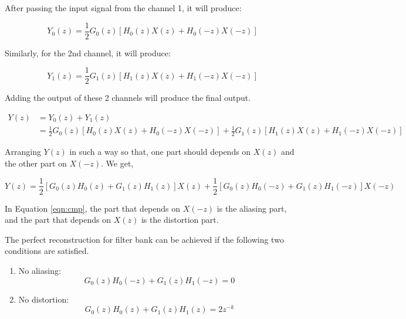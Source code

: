 After passing the input signal from the channel 1, it will produce:

\begin{equation} \label{eqn_wavelet_transform}
{Y_{0}(z) = \frac{1}{2}G_{0}(z)[H_{0}(z)X(z) + H_{0}(-z)X(-z)]}
\end{equation}

Similarly, for the 2nd channel, it will produce:


\begin{equation} \label{eqn_wavelet_transform}
{Y_{1}(z) = \frac{1}{2}G_{1}(z)[H_{1}(z)X(z) + H_{1}(-z)X(-z)]}
\end{equation}

Adding the output of these 2 channels will produce the final output.



\begin{equation} \label{eq1}
\begin{split}
Y(z)  &= Y_{0}(z) + Y_{1}(z) \\
&= \frac{1}{2}G_{0}(z)[H_{0}(z)X(z) + H_{0}(-z)X(-z)] + \frac{1}{2}G_{1}(z)[H_{1}(z)X(z) + H_{1}(-z)X(-z)]
\end{split}
\end{equation}


Arranging $Y(z)$ in such a way so that, one part should depends on $X(z)$ and the other part on $X(-z)$. We get,

\begin{equation} \label{eqn:cmp}
{Y(z) = \frac{1}{2}[G_{0}(z)H_{0}(z) + G_{1}(z)H_{1}(z)]X(z) + \frac{1}{2}[G_{0}(z)H_{0}(-z) + G_{1}(z)H_{1}(-z)]X(-z)}
\end{equation}

In Equation \ref{eqn:cmp}, the part that depends on $X(-z)$ is the aliasing part, and the part that depends on $X(z)$ is the distortion part.



The perfect reconstruction for filter bank can be achieved if the following two conditions are satisfied.

\begin{enumerate}
	\item No aliasing: 
	\begin{equation} \label{eqn:noalias}
	{G_{0}(z)H_{0}(-z) + G_{1}(z)H_{1}(-z) = 0}
	\end{equation}
	\item No distortion:
	\begin{equation} \label{eqn:nodistor}
	{G_{0}(z)H_{0}(z) + G_{1}(z)H_{1}(z) = 2z^{-k}}
	\end{equation}
\end{enumerate}


